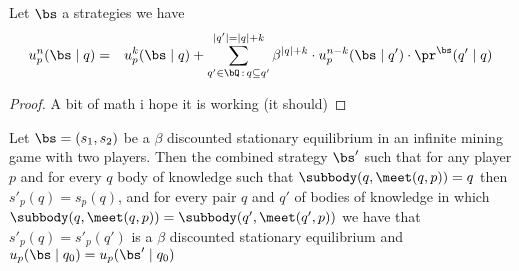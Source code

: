 \begin{mylem}
	Let $\bs$ a strategies we have  
	\begin{eqnarray*}
		u_p^n(\bs \mid q) & = & u_p^k(\bs \mid q) + \sum_{q' \in \bQ \,:\, q \subseteq q'}^{|q'| = |q|+k} \beta^{|q|+k} \cdot  u_p^{n-k}(\bs \mid q') \cdot \pr^{\bs}(q' \mid q) \\
	 \end{eqnarray*}
\end{mylem}
\begin{proof}
	A bit of math i hope it is working (it should)
\end{proof}

\begin{mylem}
	Let $\bs = (s_1,s_2)$ be a $\beta$ discounted stationary equilibrium in an infinite mining game with two players. 
	Then the combined strategy $\bs'$ such that for any player $p$  and for every $q$ body of knowledge such that $\subbody(q,\meet(q,p)) = q$ then $s'_p(q) = s_p(q)$,
	and for every pair $q$ and $q'$ of 
	bodies of knowledge in which $\subbody(q,\meet(q,p)) = \subbody(q',\meet(q',p))$ we have that 
	$s'_p(q) = s'_p(q')$ is a $\beta$ discounted stationary equilibrium and $u_p(\bs \mid q_0) = u_p(\bs' \mid q_0)$
\end{mylem}

